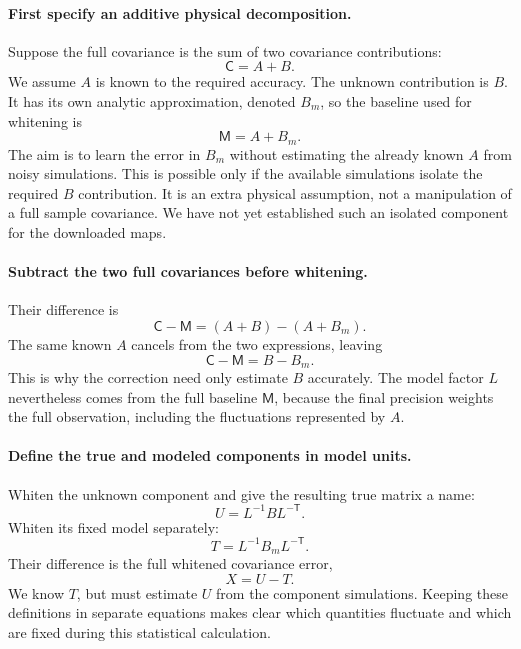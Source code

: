 \documentclass[11pt]{article}
\newcommand{\Cov}{\mathsf{C}}
\newcommand{\M}{\mathsf{M}}
\begin{document}
\paragraph{First specify an additive physical decomposition.}
Suppose the full covariance is the sum of two covariance contributions:
\begin{equation}
 \Cov=A+B.
\end{equation}
We assume $A$ is known to the required accuracy. The unknown contribution
is $B$. It has its own analytic approximation, denoted $B_m$, so the
baseline used for whitening is
\begin{equation}
 \M=A+B_m.
\end{equation}
The aim is to learn the error in $B_m$ without estimating the already
known $A$ from noisy simulations. This is possible only if the available
simulations isolate the required $B$ contribution. It is an extra physical
assumption, not a manipulation of a full sample covariance. We have not yet
established such an isolated component for the downloaded maps.

\paragraph{Subtract the two full covariances before whitening.}
Their difference is
\begin{equation}
 \Cov-\M=(A+B)-(A+B_m).
\end{equation}
The same known $A$ cancels from the two expressions, leaving
\begin{equation}
 \Cov-\M=B-B_m.
\end{equation}
This is why the correction need only estimate $B$ accurately. The model
factor $L$ nevertheless comes from the full baseline $\M$, because the
final precision weights the full observation, including the fluctuations
represented by $A$.

\paragraph{Define the true and modeled components in model units.}
Whiten the unknown component and give the resulting true matrix a name:
\begin{equation}
 U=L^{-1}B L^{-\mathsf T}.
\end{equation}
Whiten its fixed model separately:
\begin{equation}
 T=L^{-1}B_m L^{-\mathsf T}.
\end{equation}
Their difference is the full whitened covariance error,
\begin{equation}
 X=U-T.
\end{equation}
We know $T$, but must estimate $U$ from the component simulations. Keeping
these definitions in separate equations makes clear which quantities
fluctuate and which are fixed during this statistical calculation.
\end{document}

